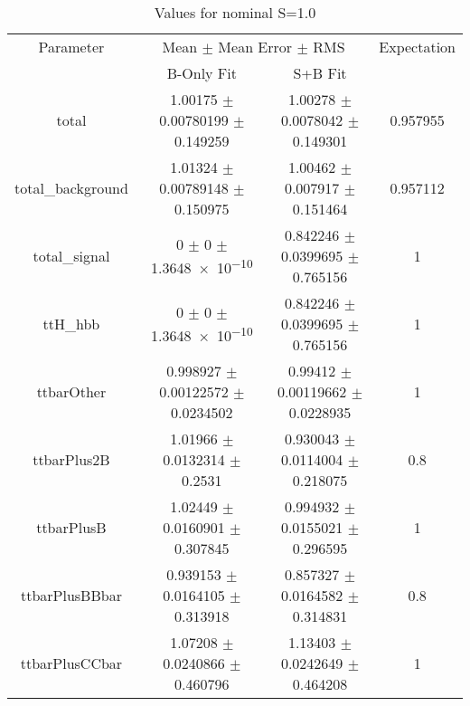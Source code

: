 \begin{table}
\centering
\caption{Values for nominal S=1.0}
\begin{tabular}{cccc}
\toprule
Parameter & \multicolumn{2}{c}{Mean $\pm$ Mean Error $\pm$ RMS} & Expectation\\
 & B-Only Fit & S+B Fit & \\
\midrule
total & \num{1.00175} $\pm$ \num{0.00780199} $\pm$ \num{0.149259} & \num{1.00278} $\pm$ \num{0.0078042} $\pm$ \num{0.149301} & \num{0.957955}\\
total\_background & \num{1.01324} $\pm$ \num{0.00789148} $\pm$ \num{0.150975} & \num{1.00462} $\pm$ \num{0.007917} $\pm$ \num{0.151464} & \num{0.957112}\\
total\_signal & \num{0} $\pm$ \num{0} $\pm$ \num{1.3648e-10} & \num{0.842246} $\pm$ \num{0.0399695} $\pm$ \num{0.765156} & \num{1}\\
ttH\_hbb & \num{0} $\pm$ \num{0} $\pm$ \num{1.3648e-10} & \num{0.842246} $\pm$ \num{0.0399695} $\pm$ \num{0.765156} & \num{1}\\
ttbarOther & \num{0.998927} $\pm$ \num{0.00122572} $\pm$ \num{0.0234502} & \num{0.99412} $\pm$ \num{0.00119662} $\pm$ \num{0.0228935} & \num{1}\\
ttbarPlus2B & \num{1.01966} $\pm$ \num{0.0132314} $\pm$ \num{0.2531} & \num{0.930043} $\pm$ \num{0.0114004} $\pm$ \num{0.218075} & \num{0.8}\\
ttbarPlusB & \num{1.02449} $\pm$ \num{0.0160901} $\pm$ \num{0.307845} & \num{0.994932} $\pm$ \num{0.0155021} $\pm$ \num{0.296595} & \num{1}\\
ttbarPlusBBbar & \num{0.939153} $\pm$ \num{0.0164105} $\pm$ \num{0.313918} & \num{0.857327} $\pm$ \num{0.0164582} $\pm$ \num{0.314831} & \num{0.8}\\
ttbarPlusCCbar & \num{1.07208} $\pm$ \num{0.0240866} $\pm$ \num{0.460796} & \num{1.13403} $\pm$ \num{0.0242649} $\pm$ \num{0.464208} & \num{1}\\
\bottomrule
\end{tabular}
\end{table}